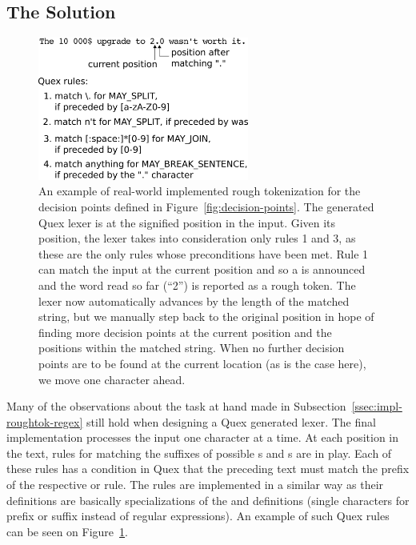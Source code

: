 \subsection{The Solution}
\label{ssec:impl-roughtok-solution}

\begin{figure}
  \includegraphics[width=0.618033988\textwidth]{img/quexexample.eps}
  \caption{An example of real-world implemented rough tokenization for the
           decision points defined in Figure~\ref{fig:decision-points}. The
           generated Quex lexer is at the signified position in the input.
           Given its position, the lexer takes into consideration only rules
           1 and 3, as these are the only rules whose preconditions have been
           met. Rule 1 can match the input at the current position and so a
           \maysplit{} is announced and the word read so far (``2'') is
           reported as a rough token. The lexer now automatically advances by
           the length of the matched string, but we manually step back to the
           original position in hope of finding more decision points at the
           current position and the positions within the matched string. When
           no further decision points are to be found at the current location
           (as is the case here), we move one character ahead.}
  \label{fig:quex-example}
\end{figure}

Many of the observations about the task at hand made in
Subsection~\ref{ssec:impl-roughtok-regex} still hold when designing a Quex
generated lexer. The final implementation processes the input one character at
a time. At each position in the text, rules for matching the suffixes of
possible \maysplit{}s and \mayjoin{}s are in play. Each of these rules has a
condition in Quex that the preceding text must match the prefix of the
respective \maysplit{} or \mayjoin{} rule. The \maybreaksentence{} rules
are implemented in a similar way as their definitions are basically
specializations of the \maysplit{} and \mayjoin{} definitions (single
characters for prefix or suffix instead of regular expressions). An example of
such Quex rules can be seen on Figure~\ref{fig:quex-example}.

